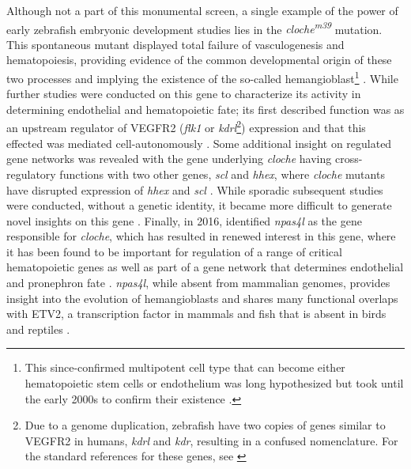 Although not a part of this monumental screen, a single example of the power of early zebrafish embryonic development studies lies in the \textit{cloche\textsuperscript{m39}} mutation. This spontaneous mutant displayed total failure of vasculogenesis and hematopoiesis, providing evidence of the common developmental origin of these two processes and implying the existence of the so\hyp{}called hemangioblast\footnote{This since\hyp{}confirmed multipotent cell type that can become either hematopoietic stem cells or endothelium was long hypothesized \citep{Sabin1920, Murray1932} but took until the early 2000s to confirm their existence \citep{Xiong2008}.} \citep{Stainier1995}. While further studies were conducted on this gene to characterize its activity in determining endothelial and hematopoietic fate; its first described function was as an upstream regulator of VEGFR2 (\textit{flk1} or \textit{kdrl}\footnote{Due to a genome duplication, zebrafish have two copies of genes similar to VEGFR2 in humans, \textit{kdrl} and \textit{kdr}, resulting in a confused nomenclature. For the standard references for these genes, see \citet{Bussmann2008}}) expression and that this effected was mediated cell\hyp{}autonomously \citep{Liao1997, Parker1999}. Some additional insight on regulated gene networks was revealed with the gene underlying \textit{cloche} having cross\hyp{}regulatory functions with two other genes, \textit{scl} and \textit{hhex}, where \textit{cloche} mutants have disrupted expression of \textit{hhex} and \textit{scl} \citep{Liao2000}. While sporadic subsequent studies were conducted, without a genetic identity, it became more difficult to generate novel insights on this gene \citep{Qian2005}. Finally, in 2016, \citeauthor{Reischauer2016} identified \textit{npas4l} as the gene responsible for \textit{cloche}, which has resulted in renewed interest in this gene, where it has been found to be important for regulation of a range of critical hematopoietic genes \citep{Marass2019} as well as part of a gene network that determines endothelial and pronephron fate \citep{Mattonet2022}. \textit{npas4l}, while absent from mammalian genomes, provides insight into the evolution of hemangioblasts and shares many functional overlaps with ETV2, a transcription factor in mammals and fish that is absent in birds and reptiles \citep{Vogeli2006, Weng2020}.

